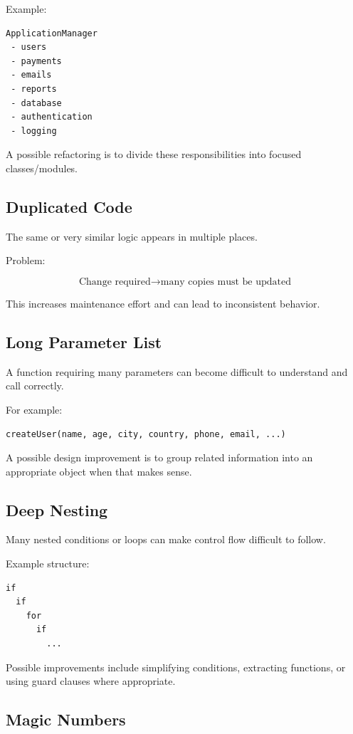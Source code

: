 \documentclass[11pt,a4paper]{article}
\begin{document}
Example:

\begin{verbatim}
ApplicationManager
 - users
 - payments
 - emails
 - reports
 - database
 - authentication
 - logging
\end{verbatim}

A possible refactoring is to divide these responsibilities into focused
classes/modules.

\subsection{Duplicated Code}

The same or very similar logic appears in multiple places.

Problem:

\[
\text{Change required}
\rightarrow
\text{many copies must be updated}
\]

This increases maintenance effort and can lead to inconsistent behavior.

\subsection{Long Parameter List}

A function requiring many parameters can become difficult to understand and
call correctly.

For example:

\begin{verbatim}
createUser(name, age, city, country, phone, email, ...)
\end{verbatim}

A possible design improvement is to group related information into an
appropriate object when that makes sense.

\subsection{Deep Nesting}

Many nested conditions or loops can make control flow difficult to follow.

Example structure:

\begin{verbatim}
if
  if
    for
      if
        ...
\end{verbatim}

Possible improvements include simplifying conditions, extracting functions,
or using guard clauses where appropriate.

\subsection{Magic Numbers}
\end{document}
